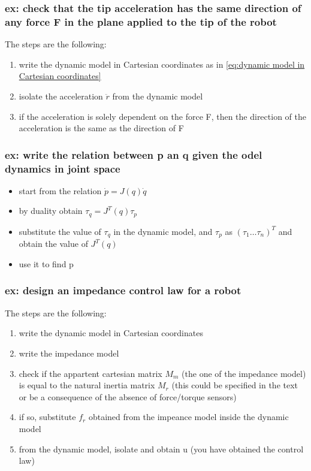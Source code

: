 \documentclass[a4paper,12pt]{article}
\begin{document}
\subsubsection{ex: check that the tip acceleration
 has the same direction of any force F 
in the plane applied to the tip of the robot}
The steps are the following:
\begin{enumerate}
    \item write the dynamic model in Cartesian coordinates as in \ref{eq:dynamic model in Cartesian coordinates}
    \item isolate the acceleration $\ddot{r}$ from the dynamic model
    \item if the acceleration is solely dependent on the force F,
     then the direction of the acceleration is the same as 
     the direction of F
\end{enumerate}
\subsubsection{ex: write the relation between p an q given the
odel dynamics in joint space}\begin{itemize}
\item start from the relation $\dot{p}=J(q)\dot{q}$
\item by duality obtain $\tau_q=J^T(q)\tau_p$
\item substitute the value of $\tau_q$ in the dynamic model,
and $\tau_p$ as $(\tau_1 \dots \tau_n)^T$ and obtain 
the value of $J^T(q)$
\item use it to find p
\end{itemize}
\subsubsection{ex: design an impedance control law for a robot}\label{sec:ex: design an impedance control law for a robot}
The steps are the following:
\begin{enumerate}
    \item write the dynamic model in Cartesian coordinates
    \item write the impedance model 
    \item check if the appartent cartesian matrix $M_m$ (the one of the 
    impedance model) is equal to the natural inertia matrix $M_r$ 
    (this could be specified in the text or be a consequence of the absence of 
    force/torque sensors)
    \item if so, substitute $f_r$ obtained from the impeance model inside the 
    dynamic model
    \item from the dynamic model, isolate and obtain u (you have obtained the control law)
\end{enumerate}
\end{document}
